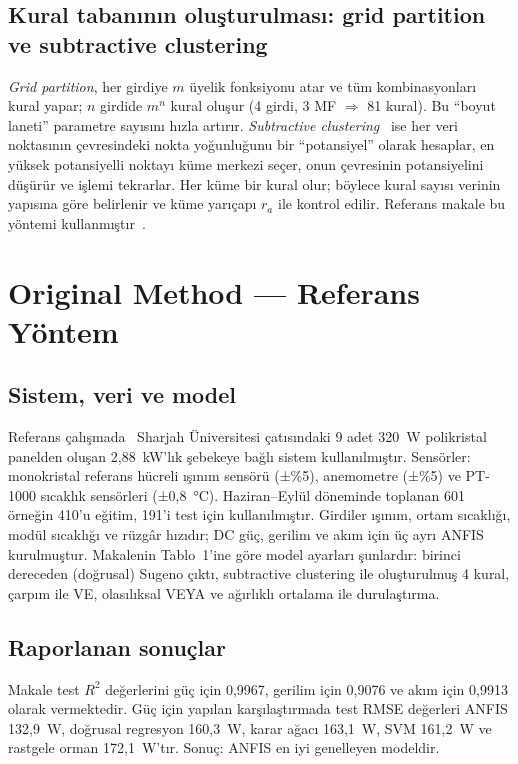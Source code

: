 \documentclass[11pt,a4paper]{article}
\begin{document}
\subsection{Kural tabanının oluşturulması: grid partition ve subtractive clustering}
\emph{Grid partition}, her girdiye $m$ üyelik fonksiyonu atar ve tüm kombinasyonları kural yapar; $n$ girdide $m^n$ kural oluşur (4 girdi, 3 MF $\Rightarrow$ 81 kural). Bu “boyut laneti” parametre sayısını hızla artırır. \emph{Subtractive clustering}~\cite{chiu1994} ise her veri noktasının çevresindeki nokta yoğunluğunu bir “potansiyel” olarak hesaplar, en yüksek potansiyelli noktayı küme merkezi seçer, onun çevresinin potansiyelini düşürür ve işlemi tekrarlar. Her küme bir kural olur; böylece kural sayısı verinin yapısına göre belirlenir ve küme yarıçapı $r_a$ ile kontrol edilir. Referans makale bu yöntemi kullanmıştır~\cite{salameh2025}.

\section{Original Method — Referans Yöntem}

\subsection{Sistem, veri ve model}
Referans çalışmada~\cite{salameh2025} Sharjah Üniversitesi çatısındaki 9 adet 320~W polikristal panelden oluşan 2,88~kW'lık şebekeye bağlı sistem kullanılmıştır. Sensörler: monokristal referans hücreli ışınım sensörü (±\%5), anemometre (±\%5) ve PT-1000 sıcaklık sensörleri (±0,8~°C). Haziran–Eylül döneminde toplanan 601 örneğin 410'u eğitim, 191'i test için kullanılmıştır. Girdiler ışınım, ortam sıcaklığı, modül sıcaklığı ve rüzgâr hızıdır; DC güç, gerilim ve akım için üç ayrı ANFIS kurulmuştur. Makalenin Tablo~1'ine göre model ayarları şunlardır: birinci dereceden (doğrusal) Sugeno çıktı, subtractive clustering ile oluşturulmuş 4 kural, çarpım ile VE, olasılıksal VEYA ve ağırlıklı ortalama ile durulaştırma.

\subsection{Raporlanan sonuçlar}
Makale test $R^2$ değerlerini güç için 0,9967, gerilim için 0,9076 ve akım için 0,9913 olarak vermektedir. Güç için yapılan karşılaştırmada test RMSE değerleri ANFIS 132,9~W, doğrusal regresyon 160,3~W, karar ağacı 163,1~W, SVM 161,2~W ve rastgele orman 172,1~W'tır. Sonuç: ANFIS en iyi genelleyen modeldir.
\end{document}
